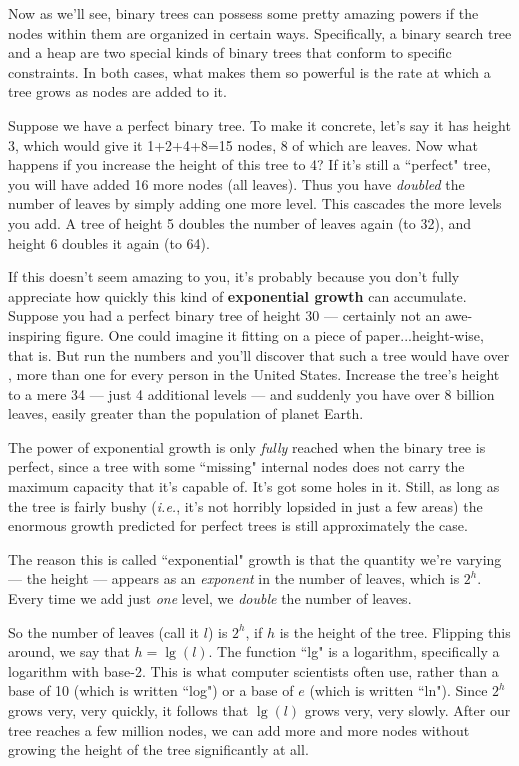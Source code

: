 Now as we'll see, binary trees can possess some pretty amazing powers if
the nodes within them are organized in certain ways. Specifically, a binary
search tree and a heap are two special kinds of binary trees that conform
to specific constraints. In both cases, what makes them so powerful is the
rate at which a tree grows as nodes are added to it.

Suppose we have a perfect binary tree. To make it concrete, let's say it
has height 3, which would give it 1+2+4+8=15 nodes, 8 of which are leaves.
Now what happens if you increase the height of this tree to 4? If it's
still a ``perfect" tree, you will have added 16 more nodes (all leaves).
Thus you have \textit{doubled} the number of leaves by simply adding one
more level. This cascades the more levels you add. A tree of height 5
doubles the number of leaves again (to 32), and height 6 doubles it again
(to 64).

If this doesn't seem amazing to you, it's probably because you don't fully
appreciate how quickly this kind of \textbf{exponential growth} can
accumulate. Suppose you had a perfect binary tree of height 30 ---
certainly not an awe-inspiring figure. One could imagine it fitting on a
piece of paper...height-wise, that is. But run the numbers and you'll
discover that such a tree would have over , more
than one for every person in the United States. Increase the tree's height
to a mere 34 --- just 4 additional levels --- and suddenly you have over 8
billion leaves, easily greater than the population of planet Earth.

The power of exponential growth is only \textit{fully} reached when the
binary tree is perfect, since a tree with some ``missing" internal nodes
does not carry the maximum capacity that it's capable of. It's got some
holes in it. Still, as long as the tree is fairly bushy (\textit{i.e.},
it's not horribly lopsided in just a few areas) the enormous growth
predicted for perfect trees is still approximately the case.

The reason this is called ``exponential" growth is that the quantity we're
varying --- the height --- appears as an \textit{exponent} in the number of
leaves, which is $2^h$. Every time we add just \textit{one} level, we
\textit{double} the number of leaves. 

So the number of leaves (call it $l$) is $2^h$, if $h$ is the height of the
tree. Flipping this around, we say that $h = \lg(l)$. The function ``lg" is
a logarithm, specifically a logarithm with base-2. This is what computer
scientists often use, rather than a base of 10 (which is written ``log") or
a base of $e$ (which is written ``ln"). Since $2^h$ grows very, very
quickly, it follows that $\lg(l)$ grows very, very slowly. After our tree
reaches a few million nodes, we can add more and more nodes without growing
the height of the tree significantly at all.

